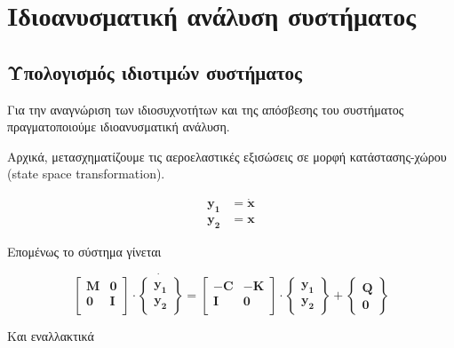 \section{Ιδιοανυσματική ανάλυση συστήματος}

\subsection{Υπολογισμός ιδιοτιμών συστήματος}
Για την αναγνώριση των ιδιοσυχνοτήτων και της απόσβεσης του συστήματος πραγματοποιούμε ιδιοανυσματική ανάλυση. 

\noindent Αρχικά, μετασχηματίζουμε τις αεροελαστικές εξισώσεις σε μορφή κατάστασης-χώρου (state space transformation). 

\begin{equation}
    \begin{aligned}
       \mathbf{y_1} &= \dot{\mathbf{x}}\\ 
       \mathbf{y_2} &= \mathbf{x} 
    \end{aligned} 
    \label{eq:transform}
\end{equation}

Επομένως το σύστημα γίνεται

\begin{equation}
\begin{bmatrix}
\mathbf{M} & \mathbf{0}\\
\mathbf{0} & \mathbf{I}\\
\end{bmatrix}\cdot
\dot{
    \begin{Bmatrix}
    \mathbf{y_1}\\
    \mathbf{y_2}
    \end{Bmatrix}
    } = 
    \begin{bmatrix}
        -\mathbf{C} & -\mathbf{K}\\
        \mathbf{I} & \mathbf{0}\\
    \end{bmatrix}\cdot
    \begin{Bmatrix}
    \mathbf{y_1}\\
    \mathbf{y_2}
    \end{Bmatrix}
    +
    \begin{Bmatrix}
    \mathbf{Q}\\
    \mathbf{0}
    \end{Bmatrix}
    \label{eq:statespace}
\end{equation}

Και εναλλακτικά

